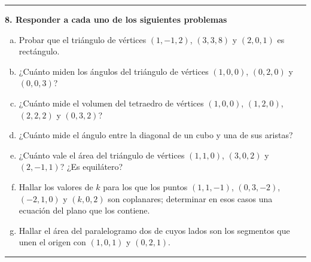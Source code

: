 \documentclass{article}
\begin{document}
\hrule
\vspace{10 pt}
\textbf{8. Responder a cada uno de los siguientes problemas}

\begin{enumerate}[(a)]
\bfseries
\item Probar que el triángulo de vértices $(1, -1, 2)$, $(3, 3, 8)$ y $(2, 0, 1)$ es rectángulo.

\item ¿Cuánto miden los ángulos del triángulo de vértices $(1, 0, 0)$, $(0, 2, 0)$ y $(0, 0, 3)$?

\item ¿Cuánto mide el volumen del tetraedro de vértices $(1, 0, 0)$, $(1, 2, 0)$, $(2, 2, 2)$ y $(0, 3, 2)$?

\item ¿Cuánto mide el ángulo entre la diagonal de un cubo y una de sus aristas?

\item ¿Cuánto vale el área del triángulo de vértices $(1, 1, 0)$, $(3, 0, 2)$ y $(2, -1, 1)$? ¿Es equilátero?

\item Hallar los valores de $k$ para los que los puntos $(1, 1, -1)$, $(0, 3, -2)$, $(-2, 1, 0)$ y $(k, 0, 2)$ son coplanares; determinar en esos casos una ecuación del plano que los contiene.

\item Hallar el área del paralelogramo dos de cuyos lados son los segmentos que unen el origen con $(1, 0, 1)$ y $(0, 2, 1)$.
\end{enumerate}
\hrule
\end{document}
